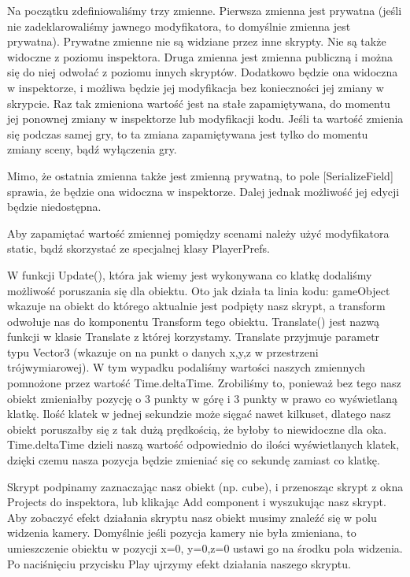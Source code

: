 \documentclass[12pt]{xmgr}
\begin{document}
Na początku zdefiniowaliśmy trzy zmienne. Pierwsza zmienna jest prywatna (jeśli nie zadeklarowaliśmy jawnego modyfikatora, to domyślnie zmienna jest prywatna). Prywatne zmienne nie są widziane przez inne skrypty. Nie są także widoczne z poziomu inspektora. Druga zmienna jest zmienna publiczną i można się do niej odwołać z poziomu innych skryptów. Dodatkowo będzie ona widoczna w inspektorze, i możliwa będzie jej modyfikacja bez konieczności jej zmiany w skrypcie. Raz tak zmieniona wartość jest na stałe zapamiętywana, do momentu jej ponownej zmiany w inspektorze lub modyfikacji kodu. Jeśli ta wartość zmienia się podczas samej gry, to ta zmiana zapamiętywana jest tylko do momentu zmiany sceny, bądź wyłączenia gry.

Mimo, że ostatnia zmienna także jest zmienną prywatną, to pole [SerializeField] sprawia, że będzie ona widoczna w inspektorze. Dalej jednak możliwość jej edycji będzie niedostępna.

Aby zapamiętać wartość zmiennej pomiędzy scenami należy użyć modyfikatora static, bądź skorzystać ze specjalnej klasy PlayerPrefs.

W funkcji Update(), która jak wiemy jest wykonywana co klatkę dodaliśmy możliwość poruszania się dla obiektu. Oto jak działa ta linia kodu: gameObject wkazuje na obiekt do którego aktualnie jest podpięty nasz skrypt, a transform odwołuje nas do komponentu Transform tego obiektu. Translate() jest nazwą funkcji w klasie Translate z której korzystamy. Translate przyjmuje parametr typu Vector3 (wkazuje on na punkt o danych x,y,z w przestrzeni trójwymiarowej). W tym wypadku podaliśmy wartości naszych zmiennych pomnożone przez wartość Time.deltaTime. Zrobiliśmy to, ponieważ bez tego nasz obiekt zmieniałby pozycję o 3 punkty w górę i 3 punkty w prawo co wyświetlaną klatkę. Ilość klatek w jednej sekundzie może sięgać nawet kilkuset, dlatego nasz obiekt poruszałby się z tak dużą prędkością, że byłoby to niewidoczne dla oka. Time.deltaTime dzieli naszą wartość odpowiednio do ilości wyświetlanych  klatek, dzięki czemu nasza pozycja będzie zmieniać się co sekundę zamiast co klatkę.

Skrypt podpinamy zaznaczając nasz obiekt (np. cube), i przenosząc skrypt z okna Projects do inspektora, lub klikając Add component i wyszukując nasz skrypt. Aby zobaczyć efekt działania skryptu nasz obiekt musimy znaleźć się w polu widzenia kamery. Domyślnie jeśli pozycja kamery nie była zmieniana, to umieszczenie obiektu w pozycji x=0, y=0,z=0 ustawi go na środku pola widzenia. Po naciśnięciu przycisku Play ujrzymy efekt działania naszego skryptu.
\end{document}
